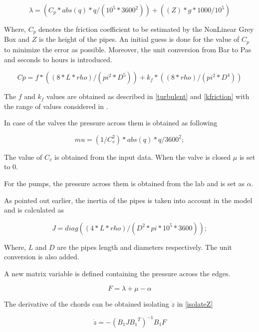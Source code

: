 \begin{equation}
\lambda = (C_p * abs(q)*q /(10^5*3600^2)) + ((Z)*g*1000/10^5)
\end{equation}

Where, $C_p$ denotes the friction coefficient to be estimated by the NonLinear Grey Box and $Z$ is the height of the pipes. An initial guess is done for the value of $C_p$ to minimize the error 
as possible. Moreover, the unit conversion from Bar to Pas and seconds to hours is introduced.

\begin{equation}
  Cp= f*((8*L*rho)/(pi^2*D^5))+k_f*((8*rho)/(pi^2*D^4))
\end{equation}

The $f$ and $k_f$ values are obtained as described in \eqref{turbulent} and \eqref{kfriction} with the range of values considered in .

In case of the valves the pressure across them is obtained as following

\begin{equation}
  mu = (1/C_v^2)* abs(q)*q /3600^2;
\end{equation}

The value of $C_v$ is obtained from the input data. When the valve is closed $\mu$ is set to 0. 

For the pumps, the pressure across them is obtained from the lab and is set as $\alpha$. 

As pointed out earlier, the inertia of the pipes is taken into account in the model and is calculated as

\begin{equation}
  J = diag((4*L*rho)/(D^2*pi*10^5*3600));
\end{equation}

Where, $L$ and $D$ are the pipes length and diameters respectively. The unit conversion is also added. 

A new matrix variable is defined containing the pressure across the edges.

\begin{equation}
  F = \lambda + \mu - \alpha
\end{equation}

The derivative of the chords can be obtained isolating $\dot{z}$ in \eqref{isolateZ}

\begin{equation}
  \dot{z}  =  - (B_1 J {B_1}^T)^{-1}B_1 F
  \label{chordder}
\end{equation}


